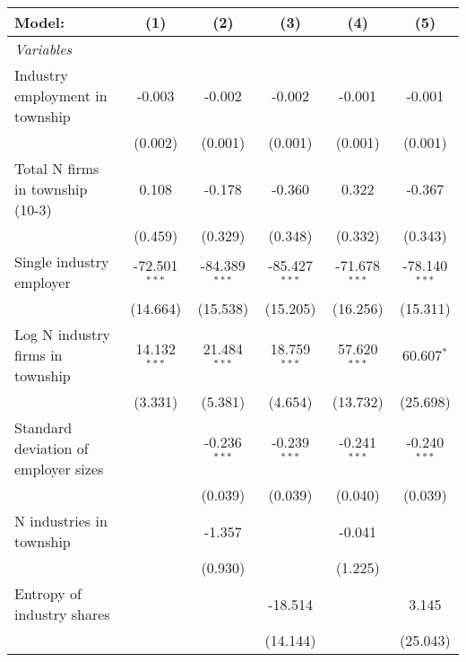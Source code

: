 \begingroup
\centering
\begin{tabular}{lccccc}
   \tabularnewline \midrule \midrule
   Model:                               & (1)             & (2)             & (3)             & (4)             & (5)\\  
   \midrule
   \emph{Variables}\\
   Industry employment in township      & -0.003          & -0.002          & -0.002          & -0.001          & -0.001\\   
                                        & (0.002)         & (0.001)         & (0.001)         & (0.001)         & (0.001)\\   
   Total N firms in township (10-3)     & 0.108           & -0.178          & -0.360          & 0.322           & -0.367\\   
                                        & (0.459)         & (0.329)         & (0.348)         & (0.332)         & (0.343)\\   
   Single industry employer             & -72.501$^{***}$ & -84.389$^{***}$ & -85.427$^{***}$ & -71.678$^{***}$ & -78.140$^{***}$\\   
                                        & (14.664)        & (15.538)        & (15.205)        & (16.256)        & (15.311)\\   
   Log N industry firms in township     & 14.132$^{***}$  & 21.484$^{***}$  & 18.759$^{***}$  & 57.620$^{***}$  & 60.607$^{*}$\\   
                                        & (3.331)         & (5.381)         & (4.654)         & (13.732)        & (25.698)\\   
   Standard deviation of employer sizes &                 & -0.236$^{***}$  & -0.239$^{***}$  & -0.241$^{***}$  & -0.240$^{***}$\\   
                                        &                 & (0.039)         & (0.039)         & (0.040)         & (0.039)\\   
   N industries in township             &                 & -1.357          &                 & -0.041          &   \\   
                                        &                 & (0.930)         &                 & (1.225)         &   \\   
   Entropy of industry shares           &                 &                 & -18.514         &                 & 3.145\\   
                                        &                 &                 & (14.144)        &                 & (25.043)\\   

\end{tabular}
